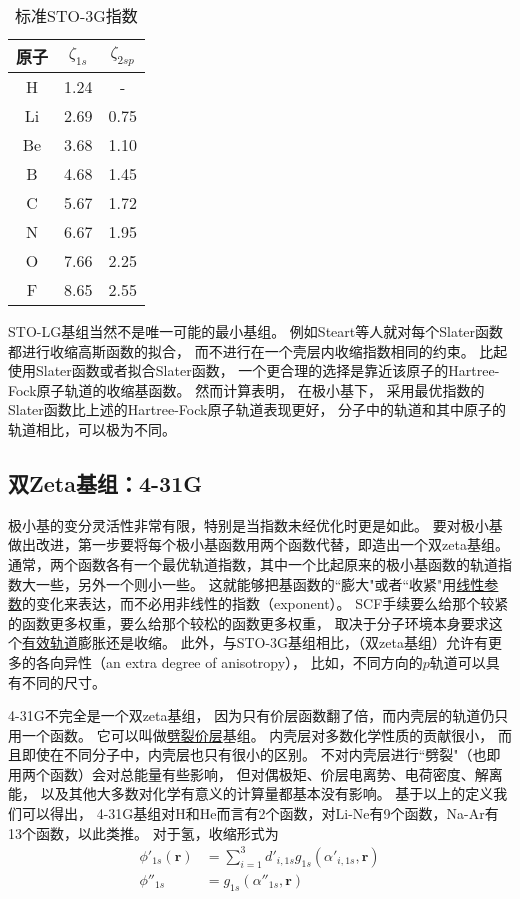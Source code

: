 \begin{table}[h]
	\centering\caption{标准STO-3G指数}
	\begin{tabular}{ccc}
		\hline
		原子&$\zeta_{1s}$&$\zeta_{2sp}$\\\hline
		H	 &1.24&-\\
		Li	 &2.69&0.75\\		
		Be	 &3.68&1.10\\
		B	 &4.68&1.45\\
		C	 &5.67&1.72\\
		N	 &6.67&1.95\\		
		O	 &7.66&2.25\\
		F	 &8.65&2.55\\
		\hline
	\end{tabular}
	\label{t3.8}
\end{table}

STO-LG基组当然不是唯一可能的最小基组。
例如Steart等人就对每个Slater函数都进行收缩高斯函数的拟合，
而不进行在一个壳层内收缩指数相同的约束。
比起使用Slater函数或者拟合Slater函数，
一个更合理的选择是靠近该原子的Hartree-Fock原子轨道的收缩基函数。
然而计算表明，
在极小基下，
采用最优指数的Slater函数比上述的Hartree-Fock原子轨道表现更好，
分子中的轨道和其中原子的轨道相比，可以极为不同。
\subsection{双Zeta基组：4-31G}
极小基的变分灵活性非常有限，特别是当指数未经优化时更是如此。
要对极小基做出改进，第一步要将每个极小基函数用两个函数代替，即造出一个双zeta基组。
通常，两个函数各有一个最优轨道指数，其中一个比起原来的极小基函数的轨道指数大一些，另外一个则小一些。
这就能够把基函数的``膨大"或者``收紧"用\underline{线性参数}的变化来表达，而不必用非线性的指数（exponent）。
SCF手续要么给那个较紧的函数更多权重，要么给那个较松的函数更多权重，
取决于分子环境本身要求这个\underline{有效轨道}膨胀还是收缩。
此外，与STO-3G基组相比，（双zeta基组）允许有更多的各向异性（an extra degree of anisotropy），
比如，不同方向的$p$轨道可以具有不同的尺寸。

4-31G不完全是一个双zeta基组，
因为只有价层函数翻了倍，而内壳层的轨道仍只用一个函数。
它可以叫做\underline{劈裂价层}基组。
内壳层对多数化学性质的贡献很小，
而且即使在不同分子中，内壳层也只有很小的区别。
不对内壳层进行``劈裂"（也即用两个函数）会对总能量有些影响，
但对偶极矩、价层电离势、电荷密度、解离能，
以及其他大多数对化学有意义的计算量都基本没有影响。
基于以上的定义我们可以得出，
4-31G基组对H和He而言有2个函数，对Li-Ne有9个函数，Na-Ar有13个函数，以此类推。
对于氢，收缩形式为
\begin{align}
    \phi'_{1s}(\mathbf{r}) & = \sum_{i=1}^3 d'_{i,1s}g_{1s}(\alpha'_{i,1s}, \mathbf{r})
    \\
    \phi''_{1s} & = g_{1s}(\alpha''_{1s},\mathbf{r}) 
\end{align}

